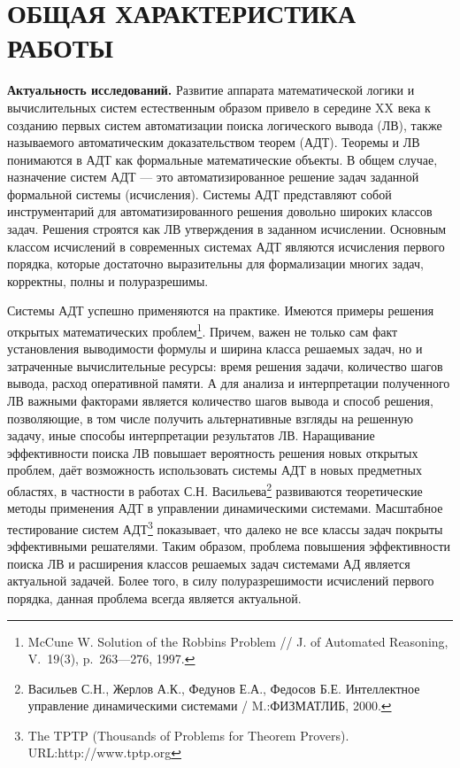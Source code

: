 \documentclass[a4paper]{report}
\begin{document}
\newpage

\section*{ОБЩАЯ ХАРАКТЕРИСТИКА РАБОТЫ}

\textbf{Актуальность исследований.}
Развитие аппарата математической логики и вычислительных систем естественным образом привело в середине XX века к созданию первых систем автоматизации поиска логического вывода (ЛВ), также называемого автоматическим доказательством теорем (АДТ). Теоремы и ЛВ понимаются в АДТ как формальные математические объекты. В общем случае, назначение систем АДТ --- это автоматизированное решение задач заданной формальной системы (исчисления). Системы АДТ представляют собой инструментарий для автоматизированного решения довольно широких классов задач. Решения строятся как ЛВ утверждения в заданном исчислении. Основным классом исчислений в современных системах АДТ являются исчисления первого порядка, которые достаточно выразительны для формализации многих задач, корректны, полны и полуразрешимы.

Системы АДТ успешно применяются на практике. Имеются примеры решения открытых математических проблем\footnote{McCune W. Solution of the Robbins Problem // J. of Automated Reasoning, V.~19(3), p.~263---276, 1997.}. Причем, важен не только сам факт установления выводимости формулы и ширина класса решаемых задач, но и затраченные вычислительные ресурсы: время решения задачи, количество шагов вывода, расход оперативной памяти. А для анализа и интерпретации полученного ЛВ важными факторами является количество шагов вывода и способ решения, позволяющие, в том числе получить альтернативные взгляды на решенную задачу, иные способы интерпретации результатов ЛВ. Наращивание эффективности поиска ЛВ повышает вероятность решения новых открытых проблем, даёт возможность использовать системы АДТ в новых предметных областях, в частности в работах С.Н. Васильева\footnote{Васильев С.Н., Жерлов А.К., Федунов Е.А., Федосов Б.Е.  Интеллектное управление динамическими системами /  M.:ФИЗМАТЛИБ, 2000.} развиваются теоретические методы применения АДТ в управлении динамическими системами. Масштабное тестирование систем АДТ\footnote{The TPTP (Thousands of Problems for Theorem Provers). URL:http://www.tptp.org} показывает, что далеко не все классы задач покрыты эффективными решателями. Таким образом, проблема повышения эффективности поиска ЛВ и расширения классов решаемых задач системами АД является актуальной задачей. Более того, в силу полуразрешимости исчислений первого порядка, данная проблема всегда является актуальной. %
\end{document}
